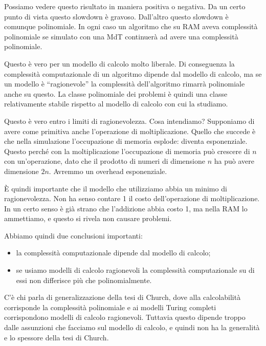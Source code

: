 Possiamo vedere questo risultato in maniera positiva o negativa. Da un certo punto di vista questo
slowdown è gravoso. Dall'altro questo slowdown è comunque polinomiale. In ogni caso un algoritmo
che su RAM aveva complessità polinomiale se simulato con una MdT continuerà ad avere una
complessità polinomiale.

Questo è vero per un modello di calcolo molto liberale. Di conseguenza la complessità
computazionale di un algoritmo dipende dal modello di calcolo, ma se un modello è ``ragionevole''
la complessità dell'algoritmo rimarrà polinomiale anche su questo. La classe polinomiale dei
problemi è quindi una classe relativamente stabile rispetto al modello di calcolo con cui la
studiamo.

Questo è vero entro i limiti di ragionevolezza. Cosa intendiamo? Supponiamo di avere come primitiva
anche l'operazione di moltiplicazione. Quello che succede è che nella simulazione l'occupazione di
memoria esplode: diventa esponenziale. Questo perché con la moltiplicazione l'occupazione di
memoria può crescere di $n$ con un'operazione, dato che il prodotto di numeri di dimensione $n$ ha
può avere dimensione $2n$. Avremmo un overhead esponenziale.

È quindi importante che il modello che utilizziamo abbia un minimo di ragionevolezza. Non ha senso
contare 1 il costo dell'operazione di moltiplicazione. In un certo senso è già strano che
l'addizione abbia costo 1, ma nella RAM lo ammettiamo, e questo si rivela non causare problemi.

Abbiamo quindi due conclusioni importanti:
\begin{itemize}
    \item la complessità computazionale dipende dal modello di calcolo;
    \item se usiamo modelli di calcolo ragionevoli la complessità computazionale su di essi non
    differisce più che polinomialmente.
\end{itemize}

C'è chi parla di generalizzazione della tesi di Church, dove alla calcolabilità corrisponde la
complessità polinomiale e ai modelli Turing completi corrispondono modelli di calcolo ragionevoli.
Tuttavia questo dipende troppo dalle assunzioni che facciamo sul modello di calcolo, e quindi non ha
la generalità e lo spessore della tesi di Church.
